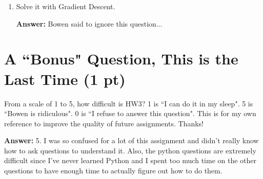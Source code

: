 \documentclass{assignment}
\begin{document}
\begin{problem}
\begin{enumerate}
\begin{enumerate}[label=(\alph*)]

        
        \item Solve it with Gradient Descent.

        \color{red}\textbf{Answer:} Bowen said to ignore this question...\color{black}


    \end{enumerate}
\end{enumerate}



\section{A ``Bonus" Question, This is the Last Time (1 pt)}

\noindent From a scale of 1 to 5, how difficult is HW3? 1 is ``I can do it in my sleep". 5 is ``Bowen is ridiculous". 0 is ``I refuse to answer this question". This is for my own reference to improve the quality of future assignments. Thanks!

\noindent \color{blue}\textbf{Answer:} 5. I was so confused for a lot of this assignment and didn't really know how to ask questions to understand it. Also, the python questions are extremely difficult since I've never learned Python and I spent too much time on the other questions to have enough time to actually figure out how to do them.\color{black}

    
\end{problem}
\end{document}
